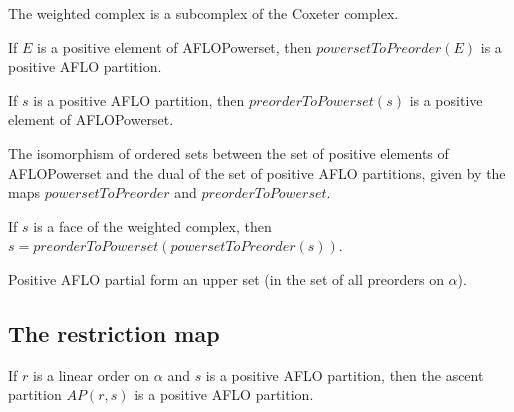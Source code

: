 \begin{sublemma}
The weighted complex is a subcomplex of the Coxeter complex.    

\end{sublemma}

\begin{sublemma}
If $E$ is a positive element of AFLOPowerset, then $powersetToPreorder(E)$ is a positive AFLO partition.

\end{sublemma}

\begin{sublemma}
If $s$ is a positive AFLO partition, then $preorderToPowerset(s)$ is a positive element of AFLOPowerset.

\end{sublemma}

\begin{subdefi}[WeightedComplextoPositivePartitions]
The isomorphism of ordered sets between the set of positive elements of AFLOPowerset and the dual of the set of positive AFLO partitions,
given by the maps $powersetToPreorder$ and $preorderToPowerset$.

\end{subdefi}

\begin{sublemma}
If $s$ is a face of the weighted complex, then
$s=preorderToPowerset(powersetToPreorder(s))$.

\end{sublemma}

\begin{sublemma}
Positive AFLO partial form an upper set (in the set of all preorders on $\alpha$).

\end{sublemma}


\subsection{The restriction map}

\begin{sublemma}
If $r$ is a linear order on $\alpha$ and $s$ is a positive AFLO partition, then the ascent partition $AP(r,s)$ is a positive AFLO partition.

\end{sublemma}

